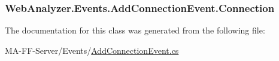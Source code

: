 \subsubsection[{Connection}]{ Web\+Analyzer.\+Events.\+Add\+Connection\+Event.\+Connection\hspace{0.3cm}{\ttfamily [get]}}\label{class_web_analyzer_1_1_events_1_1_add_connection_event_a0ae15899a3e51b1831f5f310436de660}


The documentation for this class was generated from the following file\+:\begin{DoxyCompactItemize}
\item 
M\+A-\/\+F\+F-\/\+Server/\+Events/\hyperlink{_add_connection_event_8cs}{Add\+Connection\+Event.\+cs}\end{DoxyCompactItemize}
